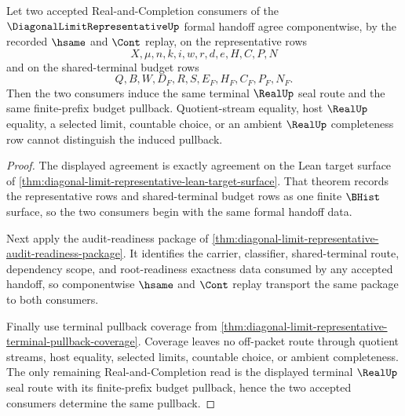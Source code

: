 \begin{theorem}
\label{thm:diagonal-limit-representative-terminal-pullback-determinacy}
Let two accepted Real-and-Completion consumers of the $\DiagonalLimitRepresentativeUp$ formal handoff agree componentwise, by the recorded $\hsame$ and $\Cont$ replay, on the representative rows
$$
X,\mu,n,k,i,w,r,d,e,H,C,P,N
$$
and on the shared-terminal budget rows
$$
Q,B,W,D_F,R,S,E_F,H_F,C_F,P_F,N_F.
$$
Then the two consumers induce the same terminal $\RealUp$ seal route and the same finite-prefix budget pullback. Quotient-stream equality, host $\RealUp$ equality, a selected limit, countable choice, or an ambient $\RealUp$ completeness row cannot distinguish the induced pullback.
\end{theorem}
\begin{proof}
The displayed agreement is exactly agreement on the Lean target surface of \autoref{thm:diagonal-limit-representative-lean-target-surface}. That theorem records the representative rows and shared-terminal budget rows as one finite $\BHist$ surface, so the two consumers begin with the same formal handoff data.

Next apply the audit-readiness package of \autoref{thm:diagonal-limit-representative-audit-readiness-package}. It identifies the carrier, classifier, shared-terminal route, dependency scope, and root-readiness exactness data consumed by any accepted handoff, so componentwise $\hsame$ and $\Cont$ replay transport the same package to both consumers.

Finally use terminal pullback coverage from \autoref{thm:diagonal-limit-representative-terminal-pullback-coverage}. Coverage leaves no off-packet route through quotient streams, host equality, selected limits, countable choice, or ambient completeness. The only remaining Real-and-Completion read is the displayed terminal $\RealUp$ seal route with its finite-prefix budget pullback, hence the two accepted consumers determine the same pullback.
\end{proof}


